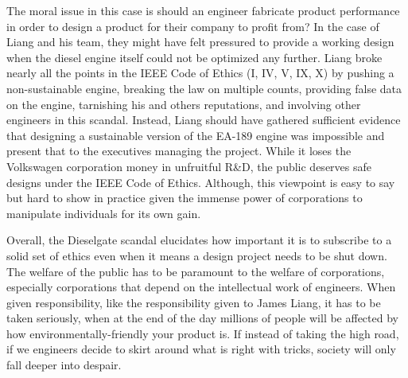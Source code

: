 \documentclass{article}
\begin{document}

The moral issue in this case is should an engineer fabricate product performance in order to design a product for their company to profit from? In the case of Liang and his team, they might have felt pressured to provide a working design when the diesel engine itself could not be optimized any further. Liang broke nearly all the points in the IEEE Code of Ethics (I, IV, V, IX, X) \cite{ieee-ethics} by pushing a non-sustainable engine, breaking the law on multiple counts, providing false data on the engine, tarnishing his and others reputations, and involving other engineers in this scandal. Instead, Liang should have gathered sufficient evidence that designing a sustainable version of the EA-189 engine was impossible and present that to the executives managing the project. While it loses the Volkswagen corporation money in unfruitful R\&D, the public deserves safe designs under the IEEE Code of Ethics. Although, this viewpoint is easy to say but hard to show in practice given the immense power of corporations to manipulate individuals for its own gain.


Overall, the Dieselgate scandal elucidates how important it is to subscribe to a solid set of ethics even when it means a design project needs to be shut down. The welfare of the public has to be paramount to the welfare of corporations, especially corporations that depend on the intellectual work of engineers. When given responsibility, like the responsibility given to James Liang, it has to be taken seriously, when at the end of the day millions of people will be affected by how environmentally-friendly your product is. If instead of taking the high road, if we engineers decide to skirt around what is right with tricks, society will only fall deeper into despair. 



\end{document}
